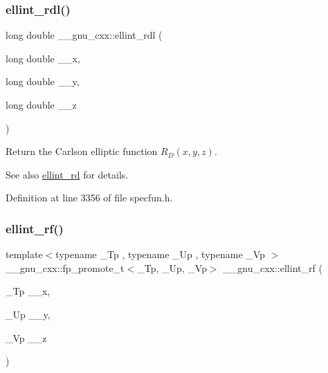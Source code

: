 \subsubsection{\texorpdfstring{ellint\+\_\+rdl()}{ellint\_rdl()}}
{\footnotesize\ttfamily long double \+\_\+\+\_\+gnu\+\_\+cxx\+::ellint\+\_\+rdl (\begin{DoxyParamCaption}\item[{long double}]{\+\_\+\+\_\+x,  }\item[{long double}]{\+\_\+\+\_\+y,  }\item[{long double}]{\+\_\+\+\_\+z }\end{DoxyParamCaption})\hspace{0.3cm}{\ttfamily [inline]}}

Return the Carlson elliptic function $ R_D(x,y,z) $.

\begin{DoxySeeAlso}{See also}
\hyperlink{group__gnu__math__spec__func_gad29dae6abc783c8fe952dba477e65309}{ellint\+\_\+rd} for details. 
\end{DoxySeeAlso}


Definition at line 3356 of file specfun.\+h.

\mbox{\label{group__gnu__math__spec__func_gae4859494464c7eaf98193f92b2235bc1}} 
\subsubsection{\texorpdfstring{ellint\+\_\+rf()}{ellint\_rf()}}
{\footnotesize\ttfamily template$<$typename \+\_\+\+Tp , typename \+\_\+\+Up , typename \+\_\+\+Vp $>$ \\
\+\_\+\+\_\+gnu\+\_\+cxx\+::fp\+\_\+promote\+\_\+t$<$\+\_\+\+Tp, \+\_\+\+Up, \+\_\+\+Vp$>$ \+\_\+\+\_\+gnu\+\_\+cxx\+::ellint\+\_\+rf (\begin{DoxyParamCaption}\item[{\+\_\+\+Tp}]{\+\_\+\+\_\+x,  }\item[{\+\_\+\+Up}]{\+\_\+\+\_\+y,  }\item[{\+\_\+\+Vp}]{\+\_\+\+\_\+z }\end{DoxyParamCaption})\hspace{0.3cm}{\ttfamily [inline]}}

